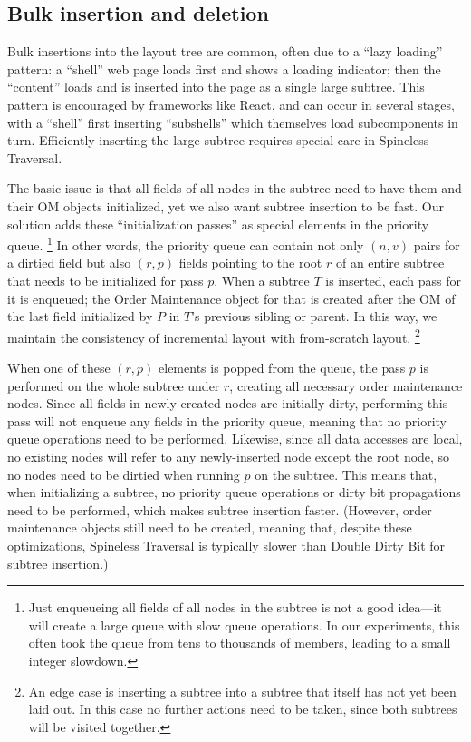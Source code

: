 \subsection{Bulk insertion and deletion}

\label{sec:tree-insertion}
Bulk insertions into the layout tree are common,
  often due to a ``lazy loading'' pattern:
  a ``shell'' web page loads first and shows a loading indicator;
  then the ``content'' loads and is inserted into the page
  as a single large subtree.
This pattern is encouraged by frameworks like React,
  and can occur in several stages, with a ``shell''
  first inserting ``subshells'' which
  themselves load subcomponents in turn.
Efficiently inserting the large subtree
  requires special care in Spineless Traversal.

The basic issue is that all fields of all nodes in the subtree
  need to have them and their OM objects initialized,
  yet we also want subtree insertion to be fast.
Our solution adds these ``initialization passes''
  as special elements in the priority queue.%
\footnote{
  Just enqueueing all fields of all nodes in the subtree
    is not a good idea---it will create a large queue with slow queue operations.
  In our experiments, this often took the queue
    from tens to thousands of members,
    leading to a small integer slowdown.
}
In other words, the priority queue can contain
  not only $(n, v)$ pairs for a dirtied field
  but also $(r, p)$ fields pointing to the root $r$
  of an entire subtree that needs to be initialized
  for pass $p$.
When a subtree $T$ is inserted, each pass for it is enqueued;
  the Order Maintenance object for that
  is created after the OM of the last field
  initialized by $P$ in $T$'s previous sibling or parent.
In this way, we maintain the consistency of incremental layout 
  with from-scratch layout.
\footnote{
  An edge case is inserting a subtree into
    a subtree that itself has not yet been laid out.
  In this case no further actions need to be taken,
    since both subtrees will be visited together.}

When one of these $(r, p)$ elements is popped from the queue,
  the pass $p$ is performed on the whole subtree under $r$,
  creating all necessary order maintenance nodes.
Since all fields in newly-created nodes are initially dirty,
  performing this pass will not enqueue any fields
  in the priority queue,
  meaning that no priority queue operations
  need to be performed.
Likewise, since all data accesses are local,
  no existing nodes will refer to any newly-inserted node
  except the root node,
  so no nodes need to be dirtied when running $p$ on the subtree.
This means that, when initializing a subtree,
  no priority queue operations or dirty bit propagations
  need to be performed,
  which makes subtree insertion faster.
(However, order maintenance objects still need to be created,
  meaning that, despite these optimizations,
  Spineless Traversal is typically
  slower than Double Dirty Bit
  for subtree insertion.)

